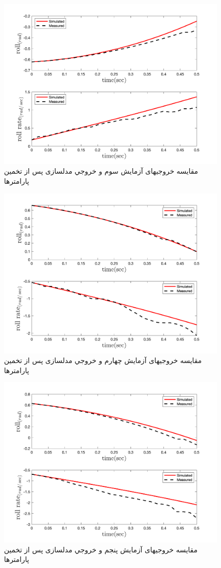 \begin{figure}[H]
	\includegraphics[width=12cm]{../../Figures/RCP/roll_parameter_estimation/RCP_roll_S3.png}
	\centering
	\caption{مقايسه خروجيهای آزمايش سوم و خروجي مدلسازی پس از تخمین پارامترها}
	\label{roll_ps3}
\end{figure}
\begin{figure}[H]
	\includegraphics[width=12cm]{../../Figures/RCP/roll_parameter_estimation/RCP_roll_S4.png}
	\centering
	\caption{مقايسه خروجيهای آزمايش چهارم و خروجي مدلسازی پس از تخمین پارامترها}
	\label{roll_ps4}
\end{figure}
\begin{figure}[H]
	\includegraphics[width=12cm]{../../Figures/RCP/roll_parameter_estimation/RCP_roll_S5.png}
	\centering
	\caption{مقايسه خروجيهای آزمايش پنجم و خروجي مدلسازی پس از تخمین پارامترها}
	\label{roll_ps5}
\end{figure}